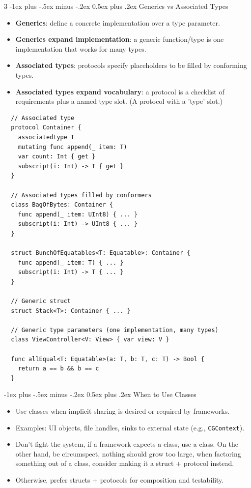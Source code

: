\documentclass[a4paper, 9pt, landscape]{extarticle}
\makeatletter
\renewcommand{\subsection}{\@startsection{subsubsection}{3}{0mm}%
                                {-1ex plus -.5ex minus -.2ex}%
                                {0.5ex plus .2ex}%
                                {\normalfont\small\bfseries}}
\makeatother
\begin{document}
\begin{multicols*}{3}
\subsection{Generics vs Associated Types}
\begin{itemize}
  \item \textbf{Generics}: define a concrete implementation over a type parameter.
  \item \textbf{Generics expand implementation}: a generic function/type is one implementation that works for many types.
  \item \textbf{Associated types}: protocols specify placeholders to be filled by conforming types.
  \item \textbf{Associated types expand vocabulary}: a protocol is a checklist of requirements plus a named type slot. (A protocol with a 'type' slot.)
\end{itemize}

\begin{verbatim}
  // Associated type
  protocol Container {
    associatedtype T
    mutating func append(_ item: T)
    var count: Int { get }
    subscript(i: Int) -> T { get }
  }

  // Associated types filled by conformers
  class BagOfBytes: Container {
    func append(_ item: UInt8) { ... }
    subscript(i: Int) -> UInt8 { ... }
  }

  struct BunchOfEquatables<T: Equatable>: Container {
    func append(_ item: T) { ... }
    subscript(i: Int) -> T { ... }
  }

  // Generic struct
  struct Stack<T>: Container { ... }

  // Generic type parameters (one implementation, many types)
  class ViewController<V: View> { var view: V }

  func allEqual<T: Equatable>(a: T, b: T, c: T) -> Bool {
    return a == b && b == c
  }
\end{verbatim}

\subsection{When to Use Classes}
\begin{itemize}
  \item Use classes when implicit sharing is desired or required by frameworks.
  \item Examples: UI objects, file handles, sinks to external state (e.g., \texttt{CGContext}).
  \item Don't fight the system, if a framework expects a class, use a class. On the other hand, be circumspect, nothing should grow too large, when factoring something out of a class, consider making it a struct + protocol instead.
  \item Otherwise, prefer structs + protocols for composition and testability.
\end{itemize}


\end{multicols*}
\end{document}
